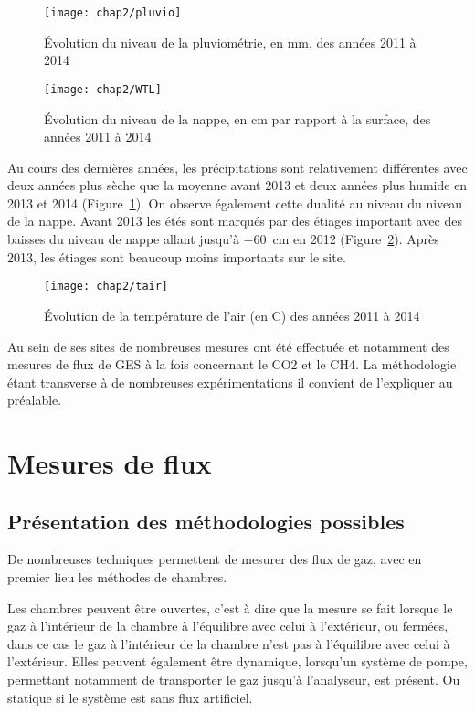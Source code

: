 \begin{figure}
\centering
\texttt{[image: chap2/pluvio]}
\caption{Évolution du niveau de la pluviométrie, en \si{\mm}, des années 2011 à 2014}
\label{fig:pluvio}
\end{figure}

\begin{figure}
\centering
\texttt{[image: chap2/WTL]}
\caption{Évolution du niveau de la nappe, en cm par rapport à la surface, des années 2011 à 2014}
\label{fig:WTL}
\end{figure}

Au cours des dernières années, les précipitations sont relativement différentes avec deux années plus sèche que la moyenne avant 2013 et deux années plus humide en 2013 et 2014 (Figure~\ref{fig:pluvio}).
On observe également cette dualité au niveau du niveau de la nappe.
Avant 2013 les étés sont marqués par des étiages important avec des baisses du niveau de nappe allant jusqu'à \SI{-60}{\cm} en 2012 (Figure~\ref{fig:WTL}).
Après 2013, les étiages sont beaucoup moins importants sur le site.



\begin{figure}
\centering
\texttt{[image: chap2/tair]}
\caption{Évolution de la température de l'air (en \textdegree C) des années 2011 à 2014}
\label{fig:tair}
\end{figure}



Au sein de ses sites de nombreuses mesures ont été effectuée et notamment des mesures de flux de GES à la fois concernant le CO2 et le CH4. La méthodologie étant transverse à de nombreuses expérimentations il convient de l'expliquer au préalable.

\section{Mesures de flux}
\label{sec:clsd_chbr_method}

\subsection{Présentation des méthodologies possibles}
De nombreuses techniques permettent de mesurer des flux de gaz, avec en premier lieu les méthodes de chambres.


Les chambres peuvent être ouvertes, c'est à dire que la mesure se fait lorsque le gaz à l'intérieur de la chambre à l'équilibre avec celui à l'extérieur, ou fermées, dans ce cas le gaz à l'intérieur de la chambre n'est pas à l'équilibre avec celui à l'extérieur.
Elles peuvent également être dynamique, lorsqu'un système de pompe, permettant notamment de transporter le gaz jusqu'à l'analyseur, est présent.
Ou statique si le système est sans flux artificiel.

